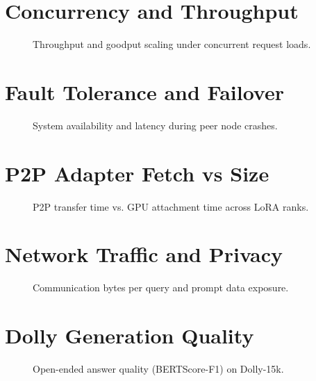 \documentclass[twocolumn]{article}
\begin{document}
\section{Concurrency and Throughput}
\begin{figure}[t]
\centering

\caption{Throughput and goodput scaling under concurrent request loads.}
\label{fig:concurrency}
\end{figure}

\section{Fault Tolerance and Failover}
\begin{figure}[t]
\centering

\caption{System availability and latency during peer node crashes.}
\label{fig:fault_tolerance}
\end{figure}

\section{P2P Adapter Fetch vs Size}
\begin{figure}[h]
\centering

\caption{P2P transfer time vs. GPU attachment time across LoRA ranks.}
\label{fig:fetch_size}
\end{figure}

\section{Network Traffic and Privacy}
\begin{figure}[h]
\centering

\caption{Communication bytes per query and prompt data exposure.}
\label{fig:communication}
\end{figure}

\section{Dolly Generation Quality}
\begin{figure}[h]
\centering

\caption{Open-ended answer quality (BERTScore-F1) on Dolly-15k.}
\label{fig:dolly_quality}
\end{figure}
\end{document}
